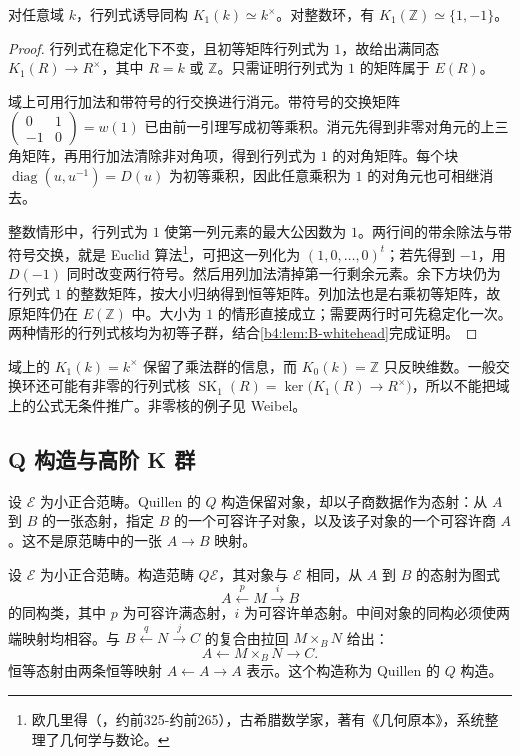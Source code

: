 \begin{theorem}\label{b4:thm:B-k1-field-integers}
	对任意域 \(k\)，行列式诱导同构 \(K_1(k)\simeq k^\times\)。对整数环，有 \(K_1(\mathbb Z)\simeq\{1,-1\}\)。
\end{theorem}
\begin{proof}
	行列式在稳定化下不变，且初等矩阵行列式为 \(1\)，故给出满同态 \(K_1(R)\rightarrow R^\times\)，其中 \(R=k\) 或 \(\mathbb Z\)。只需证明行列式为 \(1\) 的矩阵属于 \(E(R)\)。

	域上可用行加法和带符号的行交换进行消元。带符号的交换矩阵
	\(\left(\begin{smallmatrix}0&1\\-1&0\end{smallmatrix}\right)=w(1)\)
	已由前一引理写成初等乘积。消元先得到非零对角元的上三角矩阵，再用行加法清除非对角项，得到行列式为 \(1\) 的对角矩阵。每个块 \(\operatorname{diag}(u,u^{-1})=D(u)\) 为初等乘积，因此任意乘积为 \(1\) 的对角元也可相继消去。

	整数情形中，行列式为 \(1\) 使第一列元素的最大公因数为 \(1\)。两行间的带余除法与带符号交换，就是 Euclid 算法\footnote{欧几里得（，约前325-约前265），古希腊数学家，著有《几何原本》，系统整理了几何学与数论。}，可把这一列化为 \((1,0,\ldots,0)^t\)；若先得到 \(-1\)，用 \(D(-1)\) 同时改变两行符号。然后用列加法清掉第一行剩余元素。余下方块仍为行列式 \(1\) 的整数矩阵，按大小归纳得到恒等矩阵。列加法也是右乘初等矩阵，故原矩阵仍在 \(E(\mathbb Z)\) 中。大小为 \(1\) 的情形直接成立；需要两行时可先稳定化一次。两种情形的行列式核均为初等子群，结合\cref{b4:lem:B-whitehead}完成证明。
\end{proof}

域上的 \(K_1(k)=k^\times\) 保留了乘法群的信息，而 \(K_0(k)=\mathbb Z\) 只反映维数。一般交换环还可能有非零的行列式核 \(\operatorname{SK}_1(R)=\ker\bigl(K_1(R)\rightarrow R^\times\bigr)\)，所以不能把域上的公式无条件推广。非零核的例子见 Weibel\cite[Chapter III, Example 1.5.4]{Weibel2013KBook}。

\subsection{Q 构造与高阶 K 群}
\label{b4:subsec:B03:02}

设 \(\mathcal E\) 为小正合范畴。Quillen 的 \(Q\) 构造保留对象，却以子商数据作为态射：从 \(A\) 到 \(B\) 的一张态射，指定 \(B\) 的一个可容许子对象，以及该子对象的一个可容许商 \(A\)。这不是原范畴中的一张 \(A\to B\) 映射。
\begin{definition}\label{b4:def:B-q-construction}
	设 \(\mathcal E\) 为小正合范畴。构造范畴 \(Q\mathcal E\)，其对象与 \(\mathcal E\) 相同，从 \(A\) 到 \(B\) 的态射为图式
	\[
		A\xleftarrow{p}M\xrightarrow{i}B
	\]
	的同构类，其中 \(p\) 为可容许满态射，\(i\) 为可容许单态射。中间对象的同构必须使两端映射均相容。与 \(B\xleftarrow{q}N\xrightarrow{j}C\) 的复合由拉回 \(M\times_BN\) 给出：
	\[
		A\longleftarrow M\times_BN\longrightarrow C.
	\]
	恒等态射由两条恒等映射 \(A\leftarrow A\to A\) 表示。这个构造称为 Quillen 的 \(Q\) 构造。
\end{definition}

